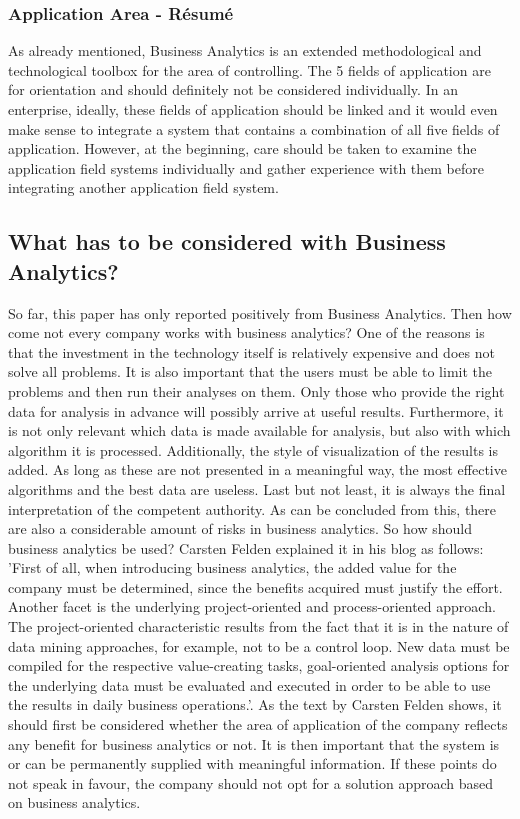 \documentclass[12pt,twocolumn,twoside]{conference}   %
\begin{document}
\subsubsection{Application Area - Résumé}
As already mentioned, Business Analytics is an extended methodological and technological toolbox for the area of controlling. The 5 fields of application are for orientation and should definitely not be considered individually. In an enterprise, ideally, these fields of application should be linked and it would even make sense to integrate a system that contains a combination of all five fields of application. However, at the beginning, care should be taken to examine the application field systems individually and gather experience with them before integrating another application field system. 

\subsection{What has to be considered with Business Analytics?}
So far, this paper has only reported positively from Business Analytics. Then how come not every company works with business analytics? One of the reasons is that the investment in the technology itself is relatively expensive and does not solve all problems. It is also important that the users must be able to limit the problems and then run their analyses on them. Only those who provide the right data for analysis in advance will possibly arrive at useful results. Furthermore, it is not only relevant which data is made available for analysis, but also with which algorithm it is processed. Additionally, the style of visualization of the results is added. As long as these are not presented in a meaningful way, the most effective algorithms and the best data are useless. Last but not least, it is always the final interpretation of the competent authority. As can be concluded from this, there are also a considerable amount of risks in business analytics. So how should business analytics be used? Carsten Felden explained it in his blog as follows: 'First of all, when introducing business analytics, the added value for the company must be determined, since the benefits acquired must justify the effort. Another facet is the underlying project-oriented and process-oriented approach. The project-oriented characteristic results from the fact that it is in the nature of data mining approaches, for example, not to be a control loop. New data must be compiled for the respective value-creating tasks, goal-oriented analysis options for the underlying data must be evaluated and executed in order to be able to use the results in daily business operations.'. \cite{Beispiel1:2016} As the text by Carsten Felden shows, it should first be considered whether the area of application of the company reflects any benefit for business analytics or not. It is then important that the system is or can be permanently supplied with meaningful information. If these points do not speak in favour, the company should not opt for a solution approach based on business analytics.
\end{document}
